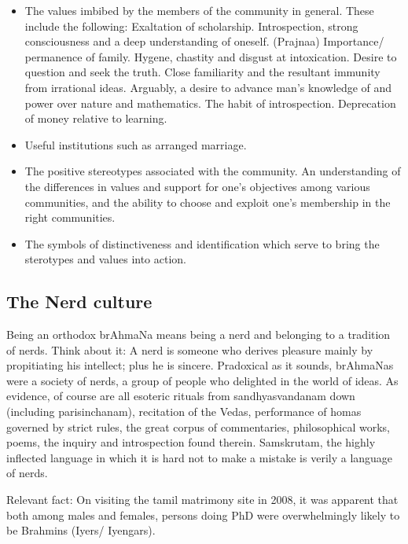 \documentclass[oneside, article]{memoir}
\begin{document}
\begin{itemize}
\item The values imbibed by the members of the community in general. These include the following:
\subitem Exaltation of scholarship.
\subitem Introspection, strong consciousness and a deep understanding of oneself. (Prajnaa)
\subitem Importance/ permanence of family.
\subitem Hygene, chastity and disgust at intoxication.
\subitem Desire to question and seek the truth. Close familiarity and the resultant immunity from irrational ideas. Arguably, a desire to advance man's knowledge of and power over nature and mathematics.
\subitem The habit of introspection.
\subitem Deprecation of money relative to learning.

\item Useful institutions such as arranged marriage.

\item The positive stereotypes associated with the community. An understanding of the differences in values and support for one's objectives among various communities, and the ability to choose and exploit one's membership in the right communities.

\item The symbols of distinctiveness and identification which serve to bring the sterotypes and values into action.
\end{itemize}


\subsection{The Nerd culture}
Being an orthodox brAhmaNa means being a nerd and belonging to a tradition of nerds. Think about it: A nerd is someone who derives pleasure mainly by propitiating his intellect; plus he is sincere. Pradoxical as it sounds, brAhmaNas were a society of nerds, a group of people who delighted in the world of ideas. As evidence, of course are all esoteric rituals from sandhyasvandanam down (including parisinchanam), recitation of the Vedas, performance of homas governed by strict rules, the great corpus of commentaries, philosophical works, poems, the inquiry and introspection found therein. Samskrutam, the highly inflected language in which it is hard not to make a mistake is verily a language of nerds.

Relevant fact: On visiting the tamil matrimony site in 2008, it was apparent that both among males and females, persons doing PhD were overwhelmingly likely to be Brahmins (Iyers/ Iyengars).
\end{document}
